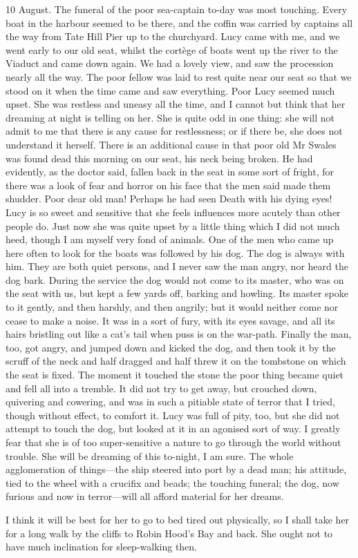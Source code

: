 \begin{diary}{10 August.}
The funeral of the poor sea-captain to-day was most touching. Every boat in the harbour seemed to be there, and the coffin was carried by captains all the way from Tate Hill Pier up to the churchyard. Lucy came with me, and we went early to our old seat, whilst the cortège of boats went up the river to the Viaduct and came down again. We had a lovely view, and saw the procession nearly all the way. The poor fellow was laid to rest quite near our seat so that we stood on it when the time came and saw everything. Poor Lucy seemed much upset. She was restless and uneasy all the time, and I cannot but think that her dreaming at night is telling on her. She is quite odd in one thing: she will not admit to me that there is any cause for restlessness; or if there be, she does not understand it herself. There is an additional cause in that poor old Mr Swales was found dead this morning on our seat, his neck being broken. He had evidently, as the doctor said, fallen back in the seat in some sort of fright, for there was a look of fear and horror on his face that the men said made them shudder. Poor dear old man! Perhaps he had seen Death with his dying eyes! Lucy is so sweet and sensitive that she feels influences more acutely than other people do. Just now she was quite upset by a little thing which I did not much heed, though I am myself very fond of animals. One of the men who came up here often to look for the boats was followed by his dog. The dog is always with him. They are both quiet persons, and I never saw the man angry, nor heard the dog bark. During the service the dog would not come to its master, who was on the seat with us, but kept a few yards off, barking and howling. Its master spoke to it gently, and then harshly, and then angrily; but it would neither come nor cease to make a noise. It was in a sort of fury, with its eyes savage, and all its hairs bristling out like a cat's tail when puss is on the war-path. Finally the man, too, got angry, and jumped down and kicked the dog, and then took it by the scruff of the neck and half dragged and half threw it on the tombstone on which the seat is fixed. The moment it touched the stone the poor thing became quiet and fell all into a tremble. It did not try to get away, but crouched down, quivering and cowering, and was in such a pitiable state of terror that I tried, though without effect, to comfort it. Lucy was full of pity, too, but she did not attempt to touch the dog, but looked at it in an agonised sort of way. I greatly fear that she is of too super-sensitive a nature to go through the world without trouble. She will be dreaming of this to-night, I am sure. The whole agglomeration of things—the ship steered into port by a dead man; his attitude, tied to the wheel with a crucifix and beads; the touching funeral; the dog, now furious and now in terror—will all afford material for her dreams.

I think it will be best for her to go to bed tired out physically, so I shall take her for a long walk by the cliffs to Robin Hood's Bay and back. She ought not to have much inclination for sleep-walking then.
\end{diary}